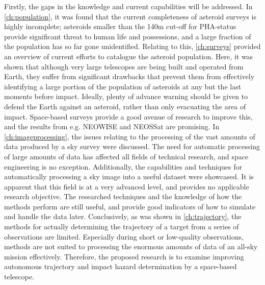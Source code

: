 Firstly, the gaps in the knowledge and current capabilities will be addressed. In \autoref{ch:population}, it was found that the current completeness of asteroid surveys is highly incomplete; asteroids smaller than the 140m cut-off for PHA-status provide significant threat to human life and possessions, and a large fraction of the population has so far gone unidentified. Relating to this, \autoref{ch:surveys} provided an overview of current efforts to catalogue the asteroid population. Here, it was shown that although very large telescopes are being built and operated from Earth, they suffer from significant drawbacks that prevent them from effectively identifying a large portion of the population of asteroids at any but the last moments before impact. Ideally, plenty of advance warning should be given to defend the Earth against an asteroid, rather than only evacuating the area of impact. Space-based surveys provide a good avenue of research to improve this, and the results from e.g. NEOWISE and NEOSSat are promising. In \autoref{ch:imageprocessing}, the issues relating to the processing of the vast amounts of data produced by a sky survey were discussed. The need for automatic processing of large amounts of data has affected all fields of technical research, and space engineering is no exception. Additionally, the capabilities and techniques for automatically processing a sky image into a useful dataset were showcased. It is apparent that this field is at a very advanced level, and provides no applicable research objective. The researched techniques and the knowledge of how the methods perform are still useful, and provide good indicators of how to simulate and handle the data later. Conclusively, as was shown in \autoref{ch:trajectory}, the methods for actually determining the trajectory of a target from a series of observations are limited. Especially during short or low-quality observations, methods are not suited to processing the enormous amounts of data of an all-sky mission effectively. Therefore, the proposed research is to examine improving autonomous trajectory and impact hazard determination by a space-based telescope.\\

